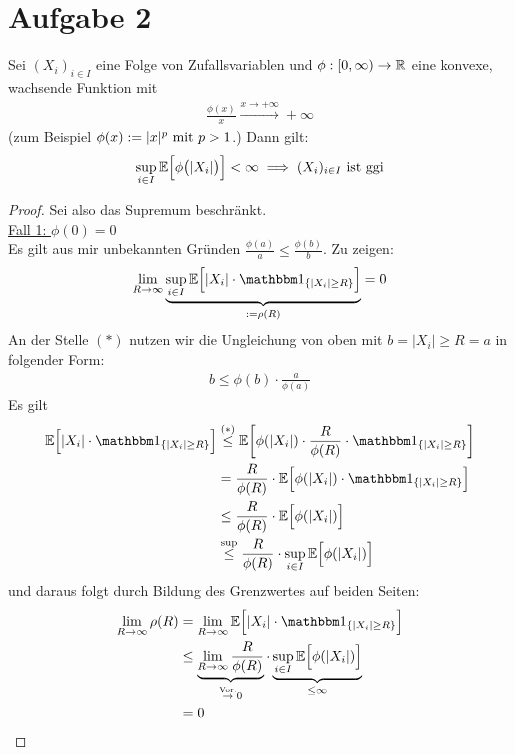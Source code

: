 \documentclass[12pt,a4paper]{article}
\begin{document}
\section*{Aufgabe 2}
Sei $(X_i)_{i\in I}$ eine Folge von Zufallsvariablen und $\phi:[0,\infty)\to\R$ eine konvexe, wachsende Funktion mit 
\begin{align*}
\frac{\phi(x)}{x}\stackrel{x\to+\infty}{\longrightarrow}+\infty
\end{align*}
(zum Beispiel $\phi(x):=|x|^p\mit p>1$.) Dann gilt:
\begin{align*}
\sup\limits_{i\in I}\E\Big[\phi\big(|X_i|\big)\Big]<\infty\implies(X_i)_{i\in I}\text{ ist ggi}
\end{align*}
\begin{proof}
Sei also das Supremum beschränkt.\\

\underline{Fall 1: $\phi(0)=0$}\\
Es gilt aus mir unbekannten Gründen $\frac{\phi(a)}{a}\leq\frac{\phi(b)}{b}$.
Zu zeigen:
\begin{align*}
\lim\limits_{R\to\infty}\underbrace{\sup\limits_{i\in I}
\E\Big[|X_i|\cdot\indi_{\lbrace |X_i|\geq R\rbrace}\Big]}_{:=\rho(R)}=0
\end{align*}
An der Stelle $(\ast)$ nutzen wir die Ungleichung von oben mit $b = |X_i| \geq R = a$ in folgender Form:
\begin{align*}
	b \leq \phi(b) \cdot \frac{a}{\phi(a)}
\end{align*}
Es gilt
\begin{align*}
\E\Big[|X_i|\cdot\indi_{\lbrace |X_i|\geq R\rbrace}\Big]
&\stackrel{(\ast)}{\leq}
\E\bigg[\phi(|X_i|)\cdot\frac{R}{\phi(R)}\cdot\indi_{\lbrace |X_i|\geq R\rbrace}\bigg]\\
&=\frac{R}{\phi(R)}\cdot\E\Big[\phi(|X_i|)\cdot\indi_{\lbrace |X_i|\geq R\rbrace}\Big]\\
&\leq\frac{R}{\phi(R)}\cdot\E\Big[\phi(|X_i|)\Big]\\
&\stackrel{\text{sup}}{\leq}
\frac{R}{\phi(R)}\cdot\sup_{i\in I}\E\Big[\phi(|X_i|)\Big]\\
\end{align*}
und daraus folgt durch Bildung des Grenzwertes auf beiden Seiten:
\begin{align*}
	\lim\limits_{R\rightarrow \infty}\rho(R)
	&=\lim\limits_{R\rightarrow \infty} \E\Big[|X_i|\cdot\indi_{\lbrace |X_i|\geq R\rbrace}\Big] \\
	&\leq 
	\underbrace{\lim\limits_{R\rightarrow \infty}\frac{R}{\phi(R)}}_{\stackrel{\text{Vor.}}{\rightarrow} 0}\cdot\underbrace{\sup_{i\in I}\E\Big[\phi(|X_i|)\Big]}_{\leq \infty}\\
	&=0
\end{align*}


\end{proof}
\end{document}
